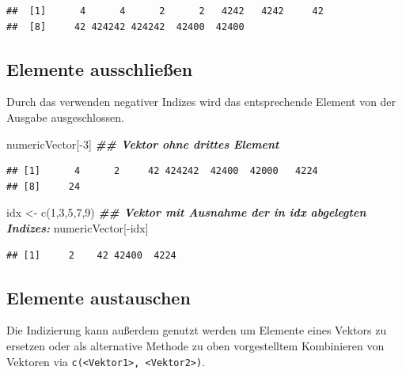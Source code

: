 \documentclass[
]{book}
\newenvironment{Shaded}{\begin{snugshade}}{\end{snugshade}}
\newcommand{\DecValTok}[1]{\textcolor[rgb]{0.00,0.00,0.81}{#1}}
\newcommand{\DocumentationTok}[1]{\textcolor[rgb]{0.56,0.35,0.01}{\textbf{\textit{#1}}}}
\newcommand{\FunctionTok}[1]{\textcolor[rgb]{0.00,0.00,0.00}{#1}}
\newcommand{\NormalTok}[1]{#1}
\newcommand{\OtherTok}[1]{\textcolor[rgb]{0.56,0.35,0.01}{#1}}
\newcommand{\SpecialCharTok}[1]{\textcolor[rgb]{0.00,0.00,0.00}{#1}}
\begin{document}
\begin{verbatim}
##  [1]      4      4      2      2   4242   4242     42
##  [8]     42 424242 424242  42400  42400
\end{verbatim}

\hypertarget{elemente-ausschlieuxdfen}{%
\subsection{Elemente ausschließen}\label{elemente-ausschlieuxdfen}}

Durch das verwenden negativer Indizes wird das entsprechende Element von der Ausgabe ausgeschlossen.

\begin{Shaded}
\begin{Highlighting}[]
\NormalTok{numericVector[}\SpecialCharTok{{-}}\DecValTok{3}\NormalTok{] }\DocumentationTok{\#\# Vektor ohne drittes Element}
\end{Highlighting}
\end{Shaded}

\begin{verbatim}
## [1]      4      2     42 424242  42400  42000   4224
## [8]     24
\end{verbatim}

\begin{Shaded}
\begin{Highlighting}[]
\NormalTok{idx }\OtherTok{\textless{}{-}} \FunctionTok{c}\NormalTok{(}\DecValTok{1}\NormalTok{,}\DecValTok{3}\NormalTok{,}\DecValTok{5}\NormalTok{,}\DecValTok{7}\NormalTok{,}\DecValTok{9}\NormalTok{)}
\DocumentationTok{\#\# Vektor mit Ausnahme der in idx abgelegten Indizes:}
\NormalTok{numericVector[}\SpecialCharTok{{-}}\NormalTok{idx]}
\end{Highlighting}
\end{Shaded}

\begin{verbatim}
## [1]     2    42 42400  4224
\end{verbatim}

\hypertarget{elemente-austauschen}{%
\subsection{Elemente austauschen}\label{elemente-austauschen}}

Die Indizierung kann außerdem genutzt werden um Elemente eines Vektors zu ersetzen oder als alternative Methode zu oben vorgestelltem Kombinieren von Vektoren via \texttt{c(\textless{}Vektor1\textgreater{},\ \textless{}Vektor2\textgreater{})}.
\end{document}
